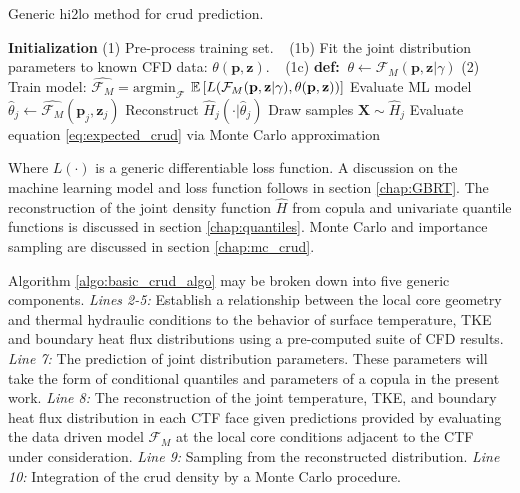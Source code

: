 \begin{algorithm}[H]
    \caption{Generic hi2lo method for crud prediction.}
    \begin{algorithmic}[1]     
    \STATE \textbf{Initialization}  
    \STATE (1) Pre-process training set.  
    \STATE $\ \ $   (1b) Fit the joint distribution parameters to known CFD data: $\theta(\mathbf p, \mathbf z)$.  
    \STATE $\ \ $   (1c) \textbf{def:}  $\ \theta \leftarrow \mathcal F_M(\mathbf p, \mathbf z | \gamma)$
    \STATE (2) Train model:  $\hat{\mathcal F_M} =  \mathrm{argmin}_{\mathcal F}$
      $\operatorname*{\mathbb{E}} \left[ L(\mathcal{F}_M (\mathbf p, \mathbf z| \gamma), \theta(\mathbf p, \mathbf z)) \right]$
    \STATE Evaluate ML model $\hat \theta_j \leftarrow \hat{\mathcal F_M}(\mathbf p_j, \mathbf z_j)$ \;
    \STATE Reconstruct $\hat H_j(\cdot |\hat \theta_j)$ \;
    \STATE Draw samples $\mathbf X \sim \hat H_j$ \;
    \STATE Evaluate equation \ref{eq:expected_crud} via Monte Carlo approximation \;
\ENDFOR
    \end{algorithmic}
\label{algo:basic_crud_algo}
\end{algorithm}
Where $L(\cdot)$ is a generic differentiable loss function.  A discussion on the machine learning model and loss function follows in section \ref{chap:GBRT}.  The reconstruction of the joint density function $\hat H$ from copula and univariate quantile functions is discussed in section \ref{chap:quantiles}.  Monte Carlo and importance sampling are discussed in section \ref{chap:mc_crud}.   

Algorithm \ref{algo:basic_crud_algo} may be broken down into five generic components.  \emph{Lines 2-5:} Establish a relationship between the local core geometry and thermal hydraulic conditions to the behavior of surface temperature, TKE and boundary heat flux distributions using a pre-computed suite of CFD results. \emph{Line 7:} The prediction of joint distribution parameters. These parameters will take the form of conditional quantiles and parameters of a copula in the present work. \emph{Line 8:} The reconstruction of the joint temperature, TKE, and boundary heat flux distribution in each CTF face given predictions provided by evaluating the data driven model $\mathcal F_M$ at the local core conditions adjacent to the CTF under consideration. \emph{Line 9:} Sampling from the reconstructed distribution.  \emph{Line 10:} Integration of the crud density by a Monte Carlo procedure.


